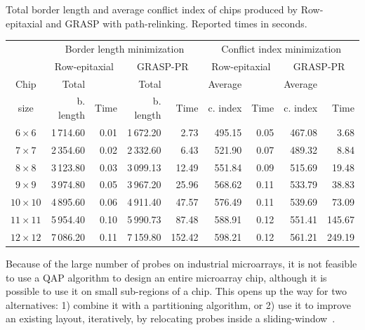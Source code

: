\documentclass[portrait]{a0poster}
\begin{document}
\begin{multicols}{3}[\aggiheader]
\begin{mytable}
\vspace*{2ex}
\caption{Total border length and average conflict index of chips produced by
Row-epitaxial and GRASP with path-relinking. Reported times in seconds.
\label{tab:graspr_reptx}}
\small{
\begin{tabular}{c||rr|rr||rr|rr|}
     & \multicolumn{4}{|c||}{Border length minimization} & \multicolumn{4}{c|}{Conflict index minimization}                                      \\ \cline{2-9}
     & \multicolumn{2}{|c|}{Row-epitaxial} & \multicolumn{2}{c||}{GRASP-PR} & \multicolumn{2}{c|}{Row-epitaxial} & \multicolumn{2}{c|}{GRASP-PR} \\ \cline{2-9}
Chip & Total     &                          & Total     &                      & Average     &                     & Average  &                  \\
size & b. length & Time                     & b. length & Time                 & c. index    & Time                & c. index & Time             \\ \hline
$6\times 6$   & 1\,714.60 & 0.01 & 1\,672.20 &   2.73 & 495.15 & 0.05 & 467.08 &   3.68 \\
$7\times 7$   & 2\,354.60 & 0.02 & 2\,332.60 &   6.43 & 521.90 & 0.07 & 489.32 &   8.84 \\
$8\times 8$   & 3\,123.80 & 0.03 & 3\,099.13 &  12.49 & 551.84 & 0.09 & 515.69 &  19.48 \\
$9\times 9$   & 3\,974.80 & 0.05 & 3\,967.20 &  25.96 & 568.62 & 0.11 & 533.79 &  38.83 \\
$10\times 10$ & 4\,895.60 & 0.06 & 4\,911.40 &  47.57 & 576.49 & 0.11 & 539.69 &  73.09 \\
$11\times 11$ & 5\,954.40 & 0.10 & 5\,990.73 &  87.48 & 588.91 & 0.12 & 551.41 & 145.67 \\
$12\times 12$ & 7\,086.20 & 0.11 & 7\,159.80 & 152.42 & 598.21 & 0.12 & 561.21 & 249.19 \\ \hline
\end{tabular}}
\vspace*{4ex}
\end{mytable}

Because of the large number of probes on industrial microarrays, it is not
feasible to use a QAP algorithm to design an entire microarray chip, although it
is possible to use it on small sub-regions of a chip. This opens up the way for
two alternatives: 1) combine it with a partitioning algorithm, or 2) use it to
improve an existing layout, iteratively, by relocating probes inside a
sliding-window~\cite{CARVALHO06}.


\end{multicols}
\end{document}
